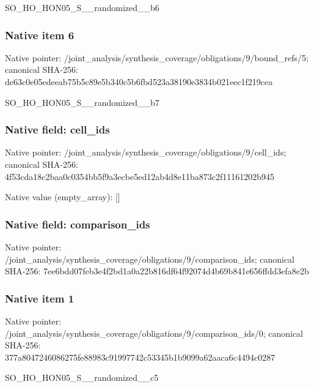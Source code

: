 \documentclass[10pt,a4paper]{article}
\begin{document}
\begingroup\raggedright\sloppy SO\_\allowbreak{}HO\_\allowbreak{}HON05\_\allowbreak{}S\_\allowbreak{}\_\allowbreak{}randomized\_\allowbreak{}\_\allowbreak{}b6\par\endgroup

\subsubsection{Native item 6}
Native pointer: /joint\_\allowbreak{}analysis/synthesis\_\allowbreak{}coverage/obligations/9/bound\_\allowbreak{}refs/5; canonical SHA-256: de63c0e05edeeab75b5c89e5b340c5b6fbd523a38190e3834b021eec1f219cea

\begingroup\raggedright\sloppy SO\_\allowbreak{}HO\_\allowbreak{}HON05\_\allowbreak{}S\_\allowbreak{}\_\allowbreak{}randomized\_\allowbreak{}\_\allowbreak{}b7\par\endgroup

\subsubsection{Native field: cell\_\allowbreak{}ids}
Native pointer: /joint\_\allowbreak{}analysis/synthesis\_\allowbreak{}coverage/obligations/9/cell\_\allowbreak{}ids; canonical SHA-256: 4f53cda18c2baa0c0354bb5f9a3ecbe5ed12ab4d8e11ba873c2f11161202b945

Native value (empty\_\allowbreak{}array): []

\subsubsection{Native field: comparison\_\allowbreak{}ids}
Native pointer: /joint\_\allowbreak{}analysis/synthesis\_\allowbreak{}coverage/obligations/9/comparison\_\allowbreak{}ids; canonical SHA-256: 7ee6bdd07feb3e4f2bd1a0a22b816df64f92074d4b69b841e656ffdd3efa8e2b

\subsubsection{Native item 1}
Native pointer: /joint\_\allowbreak{}analysis/synthesis\_\allowbreak{}coverage/obligations/9/comparison\_\allowbreak{}ids/0; canonical SHA-256: 377a8047246086275fe88983c91997742c53345b1b9099a62aaca6c4494c0287

\begingroup\raggedright\sloppy SO\_\allowbreak{}HO\_\allowbreak{}HON05\_\allowbreak{}S\_\allowbreak{}\_\allowbreak{}randomized\_\allowbreak{}\_\allowbreak{}c5\par\endgroup
\end{document}
